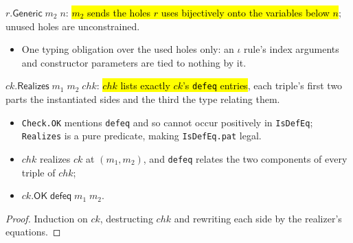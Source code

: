 \begin{definition}
\label{def:pattern-rhs-generic}
\leanok
{} 

 $r.\mathsf{Generic}\;m_2\;n$: \hl{$m_2$ sends the holes $r$ uses bijectively
onto the variables below $n$}; unused holes are unconstrained.
\begin{itemize}
\item {} One typing obligation over the used holes only: an $\iota$ rule's index
arguments and constructor parameters are tied to nothing by it.
\end{itemize}
\end{definition}

\begin{definition}
\label{def:pattern-check-realizes}
\leanok
{} 

 $ck.\mathsf{Realizes}\;m_1\;m_2\;chk$: \hl{$chk$ lists exactly $ck$'s
\texttt{defeq} entries}, each triple's first two parts the instantiated sides and the third
the type relating them.
\begin{itemize}
\item \texttt{Check.OK} mentions \texttt{defeq} and so cannot occur positively in
\texttt{IsDefEq}; \texttt{Realizes} is a pure predicate, making \texttt{IsDefEq.pat} legal.
\end{itemize}
\end{definition}

\begin{theorem}
\label{thm:pattern-realizes-took}
\leanok
{} 
\begin{itemize}
\item {} $chk$ realizes $ck$ at $(m_1,m_2)$, and \texttt{defeq} relates the two
components of every triple of $chk$;
\item {} $ck.\mathsf{OK}\;\mathsf{defeq}\;m_1\;m_2$.
\end{itemize}
\end{theorem}
\begin{proof}
\leanok
{} Induction on $ck$, destructing $chk$ and rewriting each side by the realizer's
equations.
\end{proof}

